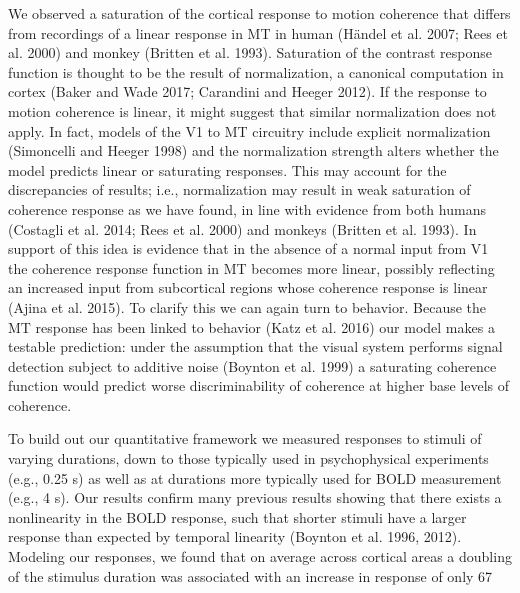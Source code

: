 \documentclass{report}
\begin{document}
We observed a saturation of the cortical response to motion coherence that differs from recordings of a linear response in MT in human (Händel et al. 2007; Rees et al. 2000) and monkey (Britten et al. 1993). Saturation of the contrast response function is thought to be the result of normalization, a canonical computation in cortex (Baker and Wade 2017; Carandini and Heeger 2012). If the response to motion coherence is linear, it might suggest that similar normalization does not apply. In fact, models of the V1 to MT circuitry include explicit normalization (Simoncelli and Heeger 1998) and the normalization strength alters whether the model predicts linear or saturating responses. This may account for the discrepancies of results; i.e., normalization may result in weak saturation of coherence response as we have found, in line with evidence from both humans (Costagli et al. 2014; Rees et al. 2000) and monkeys (Britten et al. 1993). In support of this idea is evidence that in the absence of a normal input from V1 the coherence response function in MT becomes more linear, possibly reflecting an increased input from subcortical regions whose coherence response is linear (Ajina et al. 2015). To clarify this we can again turn to behavior. Because the MT response has been linked to behavior (Katz et al. 2016) our model makes a testable prediction: under the assumption that the visual system performs signal detection subject to additive noise (Boynton et al. 1999) a saturating coherence function would predict worse discriminability of coherence at higher base levels of coherence.

To build out our quantitative framework we measured responses to stimuli of varying durations, down to those typically used in psychophysical experiments (e.g., 0.25 s) as well as at durations more typically used for BOLD measurement (e.g., 4 s). Our results confirm many previous results showing that there exists a nonlinearity in the BOLD response, such that shorter stimuli have a larger response than expected by temporal linearity (Boynton et al. 1996, 2012). Modeling our responses, we found that on average across cortical areas a doubling of the stimulus duration was associated with an increase in response of only 67%
\end{document}
